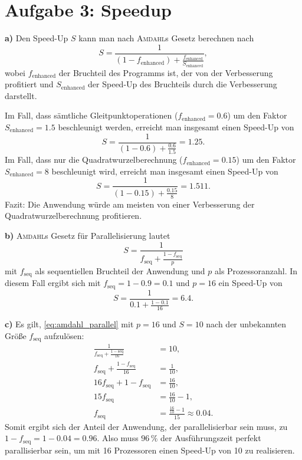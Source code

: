 \chapter{Aufgabe 3: Speedup}

\textbf{a)} Den Speed-Up $S$ kann man nach \textsc{Amdahl}s Gesetz berechnen nach
\begin{equation}
 S = \frac{1}{(1-f_\textrm{enhanced}) + \frac{f_\mathrm{enhanced}}{S_\mathrm{enhanced}}},
\end{equation}
wobei $f_\mathrm{enhanced}$ der Bruchteil des Programms ist, der von der Verbesserung profitiert und $S_\mathrm{enhanced}$ der Speed-Up des Bruchteils durch die Verbesserung darstellt.

Im Fall, dass sämtliche Gleitpunktoperationen ($f_\mathrm{enhanced} = 0.6$) um den Faktor $S_\mathrm{enhanced} = 1.5$ beschleunigt werden, erreicht man insgesamt einen Speed-Up von
\begin{equation}
 S = \frac{1}{(1-0.6) + \frac{0.6}{1.5}} = 1.25.
\end{equation}
Im Fall, dass nur die Quadratwurzelberechnung ($f_\mathrm{enhanced} = 0.15$) um den Faktor $S_\mathrm{enhanced} = 8$ beschleunigt wird, erreicht man insgesamt einen Speed-Up von 
\begin{equation}
 S = \frac{1}{(1-0.15) + \frac{0.15}{8}} = 1.511.
\end{equation}
Fazit: Die Anwendung würde am meisten von einer Verbesserung der Quadratwurzelberechnung profitieren.\medskip 

\textbf{b)} \textsc{Amdahl}s Gesetz für Parallelisierung lautet
\begin{equation}
 S = \frac{1}{f_\mathrm{seq} + \frac{1-f_\mathrm{seq}}{p}}
 \label{eq:amdahl_parallel}
\end{equation}
mit $f_\mathrm{seq}$ als sequentiellen Bruchteil der Anwendung und $p$ als Prozessoranzahl. In diesem Fall ergibt sich mit $f_\mathrm{seq} = 1-0.9 = 0.1$ und $p = 16$ ein Speed-Up von
\begin{equation}
 S = \frac{1}{0.1+\frac{1-0.1}{16}} = 6.4.
\end{equation}

\textbf{c)} Es gilt, \eqref{eq:amdahl_parallel} mit $p = 16$ und $S = 10$ nach der unbekannten Größe $f_\mathrm{seq}$ aufzulösen:
\begin{align}
 \frac{1}{f_\mathrm{seq}+\frac{1-\mathrm{seq}}{16}} &= 10, \\ 
 f_\mathrm{seq} + \frac{1-f_\mathrm{seq}}{16} &= \frac{1}{10}, \\
 16 f_\mathrm{seq} + 1 - f_\mathrm{seq} &= \frac{16}{10}, \\
 15 f_\mathrm{seq} &= \frac{16}{10} - 1, \\
 f_\mathrm{seq} &= \frac{\frac{16}{10}-1}{15} \approx 0.04.
\end{align}
Somit ergibt sich der Anteil der Anwendung, der parallelisierbar sein muss, zu $1-f_\mathrm{seq} = 1-0.04 = 0.96$. Also muss $96\,\%$ der Ausführungszeit perfekt parallisierbar sein, um mit 16 Prozessoren einen Speed-Up von 10 zu realisieren.